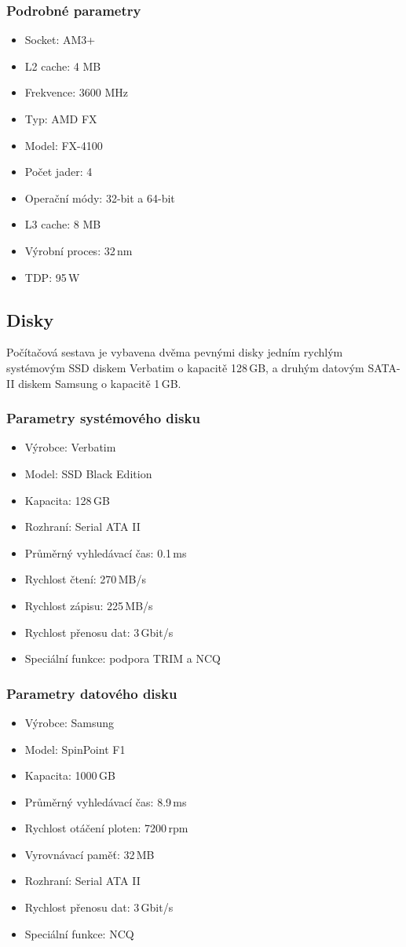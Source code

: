\subsubsection{Podrobné parametry}
\begin{itemize}
  \item Socket: AM3+
  \item L2 cache: 4 MB
  \item Frekvence: 3600 MHz
  \item Typ: AMD FX
  \item Model: FX-4100
  \item Počet jader: 4
  \item Operační módy: 32-bit a 64-bit
  \item L3 cache: 8 MB
  \item Výrobní proces: 32\,nm
  \item TDP: 95\,W
\end{itemize}

\subsection{Disky}
Počítačová sestava je vybavena dvěma pevnými disky jedním rychlým systémovým SSD diskem Verbatim o kapacitě 128\,GB, a druhým datovým SATA-II diskem Samsung o kapacitě 1\,GB.
\subsubsection{Parametry systémového disku}
\begin{itemize}
  \item Výrobce: Verbatim
  \item Model: SSD Black Edition
  \item Kapacita: 128\,GB
  \item Rozhraní: Serial ATA II
  \item Průměrný vyhledávací čas: 0.1\,ms
  \item Rychlost čtení: 270\,MB/s
  \item Rychlost zápisu: 225\,MB/s
  \item Rychlost přenosu dat: 3\,Gbit/s
  \item Speciální funkce: podpora TRIM a NCQ
\end{itemize}

\subsubsection{Parametry datového disku}
\begin{itemize}
  \item Výrobce: Samsung
  \item Model: SpinPoint F1
  \item Kapacita: 1000\,GB 
  \item Průměrný vyhledávací čas: 8.9\,ms  
  \item Rychlost otáčení ploten: 7200\,rpm
  \item Vyrovnávací paměť: 32\,MB
  \item Rozhraní: Serial ATA II
  \item Rychlost přenosu dat: 3\,Gbit/s
  \item Speciální funkce: NCQ
\end{itemize}

